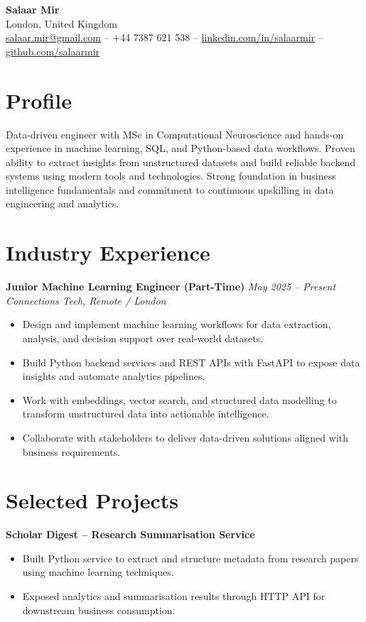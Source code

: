 \documentclass[a4paper,10pt]{article}
\begin{document}
\begin{center}
    {\LARGE \textbf{Salaar Mir}}\\[4pt]
    London, United Kingdom \\[2pt]
    \href{mailto:salaar.mir@gmail.com}{salaar.mir@gmail.com} \quad -- \quad
    +44 7387 621 538 \quad -- \quad
    \href{https://www.linkedin.com/in/salaarmir}{linkedin.com/in/salaarmir} \quad -- \quad
    \href{https://github.com/salaarmir}{github.com/salaarmir}
\end{center}

\section*{Profile}
Data-driven engineer with MSc in Computational Neuroscience and hands-on experience in machine learning, SQL, and Python-based data workflows. Proven ability to extract insights from unstructured datasets and build reliable backend systems using modern tools and technologies. Strong foundation in business intelligence fundamentals and commitment to continuous upskilling in data engineering and analytics.

\section*{Industry Experience}
\textbf{Junior Machine Learning Engineer (Part-Time)} \hfill \textit{May 2025 -- Present}\\
\textit{Connections Tech, Remote / London}
\begin{itemize}
    \item Design and implement machine learning workflows for data extraction, analysis, and decision support over real-world datasets.
    \item Build Python backend services and REST APIs with FastAPI to expose data insights and automate analytics pipelines.
    \item Work with embeddings, vector search, and structured data modelling to transform unstructured data into actionable intelligence.
    \item Collaborate with stakeholders to deliver data-driven solutions aligned with business requirements.
\end{itemize}

\section*{Selected Projects}
\textbf{Scholar Digest -- Research Summarisation Service}
\begin{itemize}
    \item Built Python service to extract and structure metadata from research papers using machine learning techniques.
    \item Exposed analytics and summarisation results through HTTP API for downstream business consumption.
\end{itemize}
\end{document}
